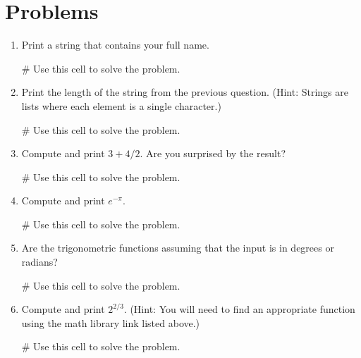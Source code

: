 \documentclass{ximera}
\begin{document}
\section{Problems}
\begin{enumerate}
    \item Print a string that contains your full name.
\begin{sageCell}
# Use this cell to solve the problem.
\end{sageCell}

    \item Print the length of the string from the previous question. (Hint: Strings are lists where each element is a single character.)
\begin{sageCell}
# Use this cell to solve the problem.
\end{sageCell}

    \item Compute and print $3+4/2$. Are you surprised by the result?
\begin{sageCell}
# Use this cell to solve the problem.
\end{sageCell}

    \item Compute and print $e^{-\pi}$.
\begin{sageCell}
# Use this cell to solve the problem.
\end{sageCell}

    \item Are the trigonometric functions assuming that the input is in degrees or radians?
\begin{sageCell}
# Use this cell to solve the problem.
\end{sageCell}

    \item Compute and print $2^{2/3}$. (Hint: You will need to find an appropriate function using the math library link listed above.)
\begin{sageCell}
# Use this cell to solve the problem.
\end{sageCell}

\end{enumerate}
\end{document}
